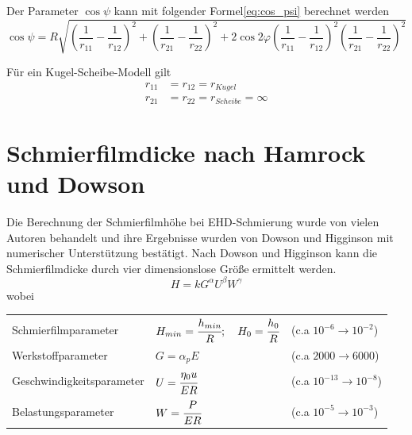 Der Parameter $\cos{\psi}$ kann mit folgender Formel\ref{eq:cos_psi} berechnet werden
\begin{equation}
    \label{eq:cos_psi}
    \cos{\psi} = R  \sqrt{\left( \frac{1}{r_{11}} - \frac{1}{r_{12}} \right)^2 
                                + \left( \frac{1}{r_{21}} - \frac{1}{r_{22}} \right)^2 
                                + 2  \cos{2 \varphi} 
                                 \left( \frac{1}{r_{11}} - \frac{1}{r_{12}}  \right)^2 
                                 \left( \frac{1}{r_{21}} - \frac{1}{r_{22}} \right)^2}
\end{equation}
%

Für ein Kugel-Scheibe-Modell gilt
%
\begin{align*}
    r_{11} &= r_{12} = r_{Kugel} \\
    r_{21} &= r_{22} = r_{Scheibe} = \infty
\end{align*}
%

\section{Schmierfilmdicke nach Hamrock und Dowson}
\label{sec:schmierfilmdicke_nach_hamrock_und_dowson}

Die Berechnung der Schmierfilmhöhe bei EHD-Schmierung wurde von vielen Autoren behandelt und ihre Ergebnisse wurden von Dowson und Higginson mit numerischer Unterstützung bestätigt.
Nach Dowson und Higginson kann die Schmierfilmdicke durch vier dimensionslose Größe ermittelt werden.
\begin{equation}
    \label{eq:allgemein_schmierfilmdicke}
    H = k G^{\alpha} U^{\beta} W^{\gamma}
\end{equation}
%
wobei

\begin{tabular}{lll}
    Schmierfilmparameter      & $H_{min} = \cfrac{h_{min}}{R} ;\quad H_0 = \cfrac{h_0}{R}$ & (c.a $10^{-6} \rightarrow 10^{-2}$)   \\
    Werkstoffparameter        & $G = \alpha_p E$                                           & (c.a $2000 \rightarrow 6000$)         \\
    Geschwindigkeitsparameter & $U = \cfrac{\eta_0 u}{E R}$                                & (c.a $10^{-13} \rightarrow 10 ^{-8}$) \\
    Belastungsparameter       & $W = \cfrac{P}{E R}$                                       & (c.a $10^{-5} \rightarrow 10^{-3}$)
\end{tabular}
%

